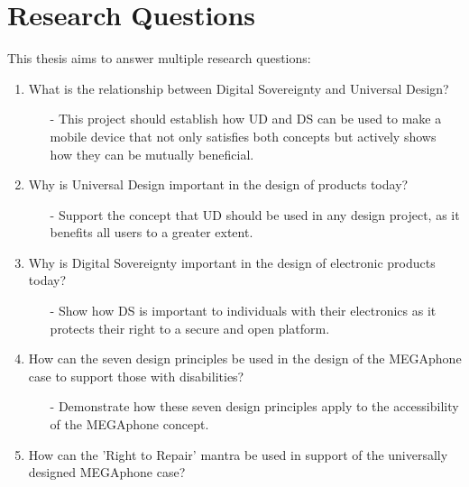\section{Research Questions}

This thesis aims to answer multiple research questions:

\begin{enumerate}
    \item What is the relationship between Digital Sovereignty and Universal Design? %
        \begin{enumerate}
        \item[-] This project should establish how UD and DS can be used to make a mobile device that not only satisfies both concepts but actively shows how they can be mutually beneficial.
        \end{enumerate} 
    \item Why is Universal Design important in the design of products today?
        \begin{enumerate}
        \item[-] Support the concept that UD should be used in any design project, as it benefits all users to a greater extent.
        \end{enumerate}
    \item Why is Digital Sovereignty important in the design of electronic products today?
        \begin{enumerate}
        \item[-] Show how DS is important to individuals with their electronics as it protects their right to a secure and open platform.
        \end{enumerate} 
    \item How can the seven design principles be used in the design of the MEGAphone case to support those with disabilities?
        \begin{enumerate}
        \item[-] Demonstrate how these seven design principles apply to the accessibility of the MEGAphone concept.
        \end{enumerate} 
    \item How can the 'Right to Repair' mantra be used in support of the universally designed MEGAphone case?
        \begin{enumerate}

\end{enumerate}
\end{enumerate}
